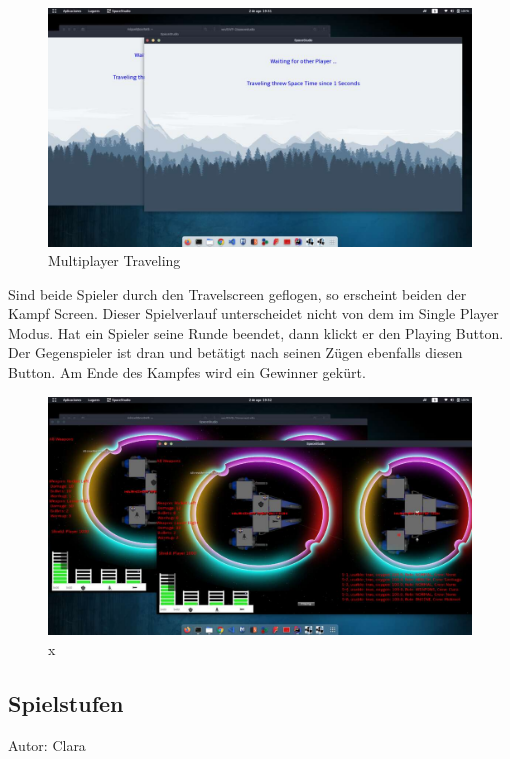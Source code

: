\documentclass[fontsize=12pt,paper=a4,twoside]{scrartcl}
\begin{document}
\begin{figure}[htp]
	\centering
	\includegraphics[width=1.00\linewidth]{pics/6.PNG}
	\caption{Multiplayer Traveling}
\end{figure}

Sind beide Spieler durch den Travelscreen geflogen, so erscheint beiden der Kampf Screen.
Dieser Spielverlauf unterscheidet nicht von dem im Single Player Modus. Hat ein Spieler seine Runde 
beendet, dann klickt er den Playing Button. Der Gegenspieler ist dran und betätigt nach seinen Zügen 
ebenfalls diesen Button.
Am Ende des Kampfes wird ein Gewinner gekürt.

\begin{figure}[htp]
	\centering
	\includegraphics[width=1.00\linewidth]{pics/7.PNG}
	\caption{x}
\end{figure}

\subsection{Spielstufen}
Autor: Clara\\
\end{document}
